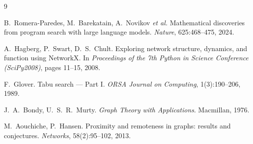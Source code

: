 \documentclass[12pt,a4paper]{article}
\begin{document}
\newpage

\begin{thebibliography}{9}

B.~Romera-Paredes, M.~Barekatain, A.~Novikov \emph{et al.}
\newblock Mathematical discoveries from program search with large language models.
\newblock \emph{Nature}, 625:468--475, 2024.

A.~Hagberg, P.~Swart, D.~S.~Chult.
\newblock Exploring network structure, dynamics, and function using {NetworkX}.
\newblock In \emph{Proceedings of the 7th Python in Science Conference
  (SciPy2008)}, pages 11--15, 2008.

F.~Glover.
\newblock Tabu search — Part I.
\newblock \emph{ORSA Journal on Computing}, 1(3):190--206, 1989.

J.~A.~Bondy, U.~S.~R.~Murty.
\newblock \emph{Graph Theory with Applications}.
\newblock Macmillan, 1976.

M.~Aouchiche, P.~Hansen.
\newblock Proximity and remoteness in graphs: results and conjectures.
\newblock \emph{Networks}, 58(2):95--102, 2013.

\end{thebibliography}
\end{document}

